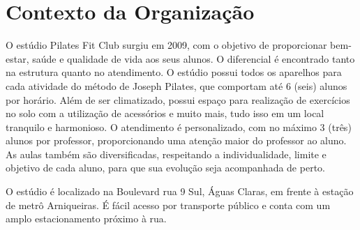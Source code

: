 \chapter[Contexto da Organização]{Contexto da Organização}
O estúdio Pilates Fit Club surgiu em 2009, com o objetivo de proporcionar
bem-estar, saúde e qualidade de vida aos seus alunos. O diferencial é encontrado
tanto na estrutura quanto no atendimento. O estúdio possui todos os aparelhos
para cada atividade do método de Joseph Pilates, que comportam até 6 (seis)
alunos por horário. Além de ser climatizado, possui espaço para realização de
exercícios no solo com a utilização de acessórios e muito mais, tudo isso em
um local tranquilo e harmonioso. O atendimento é personalizado, com no máximo 3
(três) alunos por professor, proporcionando uma atenção maior do professor ao
aluno. As aulas também são diversificadas, respeitando a individualidade,
limite e objetivo de cada aluno, para que sua evolução seja acompanhada de
perto.

O estúdio é localizado na Boulevard rua 9 Sul, Águas Claras, em frente à
estação de metrô Arniqueiras. É fácil acesso por transporte público e conta
com um amplo estacionamento próximo à rua.
